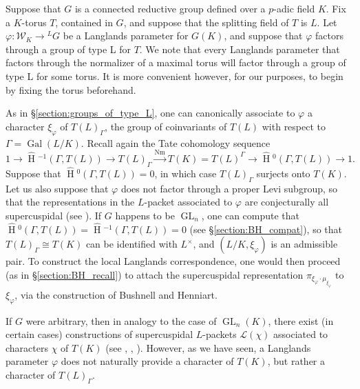 \documentclass[11pt]{amsart}
\theoremstyle{plain}
\newcommand{\HT}[1]{\hat{\HH}{}^{#1}}
\theoremstyle{definition}
\DeclareMathOperator{\Gal}{Gal}
\DeclareMathOperator{\HH}{H}
\DeclareMathOperator{\Nm}{Nm}
\DeclareMathOperator{\GL}{GL}
\newcommand{\Lx}{L^\times}
\newcommand{\Weil}{\mathcal{W}}
\newcommand{\Lpack}{\mathcal{L}}
\begin{document}
Suppose that $G$ is a connected reductive group defined over a
$p$-adic field $K$.  Fix a $K$-torus $T$, contained in $G$, and suppose
that the splitting field of $T$ is $L$.
Let $\varphi : \Weil_K \rightarrow {}^L G$ be a
Langlands parameter for $G(K)$, and suppose that $\varphi$ factors
through a group of type L for $T$.  We note that every Langlands
parameter that factors through the normalizer of a maximal torus will
factor through a group of type L for some torus.
It is more
convenient however, for our purposes, to begin by fixing the torus beforehand.

As in \S\ref{section:groups_of_type_L}, one can canonically
associate to $\varphi$ a character $\xi_{\varphi}$ of $T(L)_{\Gamma}$,
the group of coinvariants of $T(L)$ with respect
to $\Gamma = \Gal(L/K)$.
Recall again the Tate cohomology sequence
$$1 \rightarrow \HT{-1}(\Gamma,T(L)) \rightarrow T(L)_{\Gamma} \xrightarrow{\Nm} T(K)
= T(L)^{\Gamma} \rightarrow \HT{0}(\Gamma,T(L)) \rightarrow 1.$$
Suppose that $\HT{0}(\Gamma, T(L)) = 0$, in which case
$T(L)_{\Gamma}$ surjects onto $T(K)$.  Let us also suppose that
$\varphi$ does not factor through a proper Levi subgroup, so that the
representations in the $L$-packet associated to $\varphi$ are
conjecturally all supercuspidal (see \cite[\S 3.5]{reeder-debacker:09a}).
If $G$ happens to be $\GL_n$, one can compute that
$\HT{0}(\Gamma, T(L)) = \HT{-1}(\Gamma, T(L)) = 0$ (see \S\ref{section:BH_compat}),
so that
$T(L)_{\Gamma} \cong T(K)$ can be identified with $\Lx$, and
$(L/K, \xi_{\varphi})$ is an admissible pair.  To construct the local Langlands
correspondence, one would then proceed (as in \S\ref{section:BH_recall}) to
attach the supercuspidal representation $\pi_{\xi_{\varphi} \cdot
  \mu_{\xi_{\varphi}}}$ to $\xi_{\varphi}$, via the construction of Bushnell and Henniart.

If $G$ were arbitrary, then in analogy to the case of $\GL_{n}(K)$, there
exist (in certain cases) constructions of supercuspidal $L$-packets
$\Lpack(\chi)$ associated to characters $\chi$ of $T(K)$ (see
\cite{reeder-debacker:09a}, \cite{kaletha:13a}, \cite{reeder:08a}).  However, as we
have seen, a Langlands parameter $\varphi$ does not naturally
provide a character of $T(K)$, but rather a character of
$T(L)_{\Gamma}$.
\end{document}
